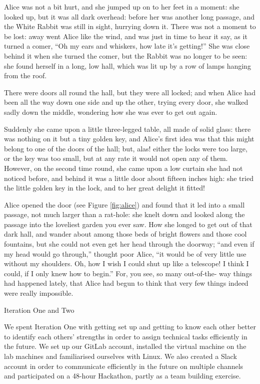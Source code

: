 \documentclass{l3proj}
\begin{document}
Alice was not a bit hurt, and she jumped up on to her feet in a moment: she
looked up, but it was all dark overhead: before her was another long
passage, and the White Rabbit was still in sight, hurrying down it. There
was not a moment to be lost: away went Alice like the wind, and was just in
time to hear it say, as it turned a comer, ``Oh my ears and whiskers, how
late it's getting!'' She was close behind it when she turned the comer, but
the Rabbit was no longer to be seen: she found herself in a long, low hall,
which was lit up by a row of lamps hanging from the roof.

There were doors all round the hall, but they were all locked; and when
Alice had been all the way down one side and up the other, trying every
door, she walked sadly down the middle, wondering how she was ever to get
out again.

Suddenly she came upon a little three-legged table, all made of solid
glass: there was nothing on it but a tiny golden key, and Alice's first
idea was that this might belong to one of the doors of the hall; but, alas!
either the locks were too large, or the key was too small, but at any rate
it would not open any of them. However, on the second time round, she came
upon a low curtain she had not noticed before, and behind it was a little
door about fifteen inches high: she tried the little golden key in the
lock, and to her great delight it fitted!



Alice opened the door (see Figure \ref{fig:alice}) and found that it
led into a small passage, not much larger than a rat-hole: she knelt
down and looked along the passage into the loveliest garden you ever
saw. How she longed to get out of that dark hall, and wander about
among those beds of bright flowers and those cool fountains, but she
could not even get her head through the doorway; ``and even if my head
would go through,'' thought poor Alice, ``it would be of very little
use without my shoulders. Oh, how I wish I could shut up like a
telescope! I think I could, if I only knew how to begin.'' For, you
see, so many out-of-the- way things had happened lately, that Alice
had begun to think that very few things indeed were really impossible.

Iteration One and Two

We spent Iteration One with getting set up and getting to know each other better to identify each others’ strengths  in order to assign technical tasks efficiently in the future.
We set up our GitLab account, installed the virtual machine on the lab machines and familiarised ourselves with Linux.
We also created a Slack account in order to communicate efficiently in the future on multiple channels and participated on a 48-hour Hackathon, partly as a team building exercise.  
\end{document}
